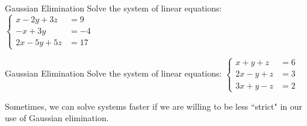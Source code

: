 \documentclass[t]{beamer}
\begin{document}
	\begin{frame}{Gaussian Elimination}
		Solve the system of linear equations: $\begin{cases}
		x - 2y + 3z &= 9 \\ -x + 3y &= -4 \\ 2x - 5y + 5z &= 17
		\end{cases}$
		
	
	
	
	
	\end{frame}

	\begin{frame}{Gaussian Elimination}
		Solve the system of linear equations: $\begin{cases}
		x + y + z &= 6 \\ 2x - y + z &= 3 \\ 3x + y - z &= 2
		\end{cases}$ \pause
		
		Sometimes, we can solve systems faster if we are willing to be less ``strict" in our use of Gaussian elimination.
	\end{frame}
\end{document}

